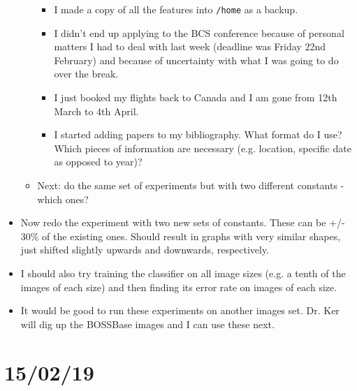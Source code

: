 \documentclass[11pt,a4paper]{report}
\begin{document}
\begin{itemize}
\begin{itemize}
\begin{itemize}
          \item I made a copy of all the features into \texttt{/home} as a backup.
          \item I didn't end up applying to the BCS conference because of personal matters I had to deal with last week (deadline was Friday 22nd February) and because of uncertainty with what I was going to do over the break.
          \item I just booked my flights back to Canada and I am gone from 12th March to 4th April.
          \item I started adding papers to my bibliography. What format do I use? Which pieces of information are necessary (e.g. location, specific date as opposed to year)?
        \end{itemize}
      \item Next: do the same set of experiments but with two different constants - which ones?
    \end{itemize}

\item Now redo the experiment with two new sets of constants. These can be +/- 30\% of the existing ones. Should result in graphs with very similar shapes, just shifted slightly upwards and downwards, respectively.

\item I should also try training the classifier on all image sizes (e.g. a tenth of the images of each size) and then finding its error rate on images of each size.

\item It would be good to run these experiments on another images set. Dr. Ker will dig up the BOSSBase images and I can use these next.

\end{itemize}

\section{15/02/19}
\end{document}

